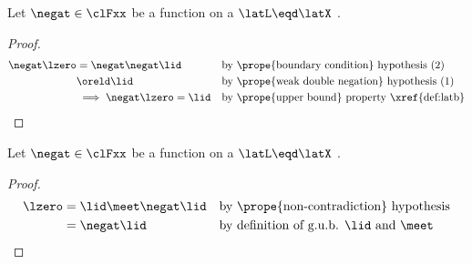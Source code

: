\begin{lemma}
\label{lem:latn_boundaries}
Let $\negat\in\clFxx$ be a function on a  $\latL\eqd\latX$ .
\end{lemma}
\begin{proof}
  \begin{align*}
    \negat\lzero
      &= \negat\negat\lid
      && \text{by \prope{boundary condition} hypothesis (2)}
    \\&\oreld \lid
      && \text{by \prope{weak double negation} hypothesis (1)}
    \\&\implies \negat\lzero=\lid
      && \text{by \prope{upper bound} property \xref{def:latb}}
  \end{align*}
\end{proof}


\begin{lemma}
\label{lem:latn_noncon}
Let $\negat\in\clFxx$ be a function on a  $\latL\eqd\latX$ .
\end{lemma}
\begin{proof}
  \begin{align*}
    \lzero
      &= \lid \meet \negat\lid
      && \text{by \prope{non-contradiction} hypothesis}
    \\&= \negat\lid
      && \text{by definition of g.u.b. $\lid$ and $\meet$}
  \end{align*}
\end{proof}

